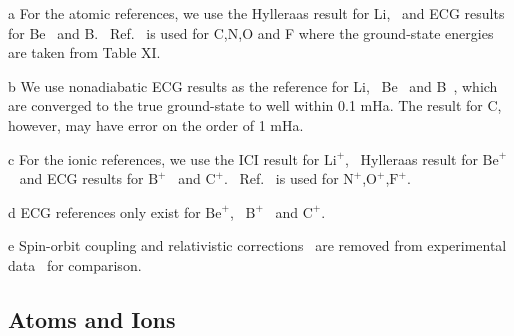 \begin{table}[t!]
\begin{threeparttable}
\begin{tablenotes}
\item[a] For the atomic references, we use the Hylleraas result for Li,~\cite{Wang_Li} and ECG results for Be~\cite{Stanke_Be} and B.~\cite{Bubin_B} Ref.~\cite{Davidson_Atoms} is used for C,N,O and F where the ground-state energies are taken from Table XI.
\item[b] We use nonadiabatic ECG results as the reference for Li,~\cite{Stanke_Li} Be~\cite{Bubin_BeH_noBO} and B~\cite{Bubin_B}, which are converged to the true ground-state to well within 0.1 mHa. The result for C,~\cite{Bubin_C} however, may have error on the order of 1 mHa.
\item[c] For the ionic references, we use the ICI result for $\text{Li}^+$,~\cite{Nakashima_Li+} Hylleraas result for $\text{Be}^+$~\cite{Puchalski_Be+} and ECG results for $\text{B}^+$~\cite{Bubin_B+} and $\text{C}^+$.~\cite{Bubin_C+,mitroy2013} Ref.~\cite{Davidson_Atoms} is used for $\text{N}^+$,$\text{O}^+$,$\text{F}^+$.
\item[d] ECG references only exist for $\text{Be}^+$,~\cite{Bubin_BeH_noBO} $\text{B}^+$~\cite{Bubin_B+} and $\text{C}^+$.~\cite{Bubin_C+}
\item[e] Spin-orbit coupling and relativistic corrections~\cite{Klopper_IP} are removed from experimental data~\cite{NIST_Atoms} for comparison.
\end{tablenotes}

\end{threeparttable}
\end{table}

\subsection{Atoms and Ions}

